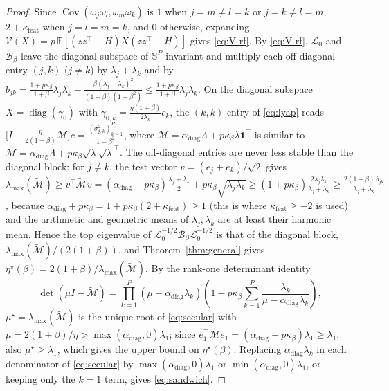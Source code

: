 \documentclass[11pt]{article}
\theoremstyle{remark}
\newcommand{\E}{\mathbb{E}}
\newcommand{\Cov}{\operatorname{Cov}}
\begin{document}
\begin{proof}
Since $\Cov(\omega_j\omega_l, \omega_m\omega_k)$ is $1$ when $j=m\ne l=k$ or $j=k\ne l=m$, $2+\kappa_{\mathrm{feat}}$ when $j=l=m=k$, and $0$ otherwise, expanding $\mathcal V(X) = p\,\E[(zz^\top - H)X(zz^\top - H)]$ gives \eqref{eq:V-rf}. By \eqref{eq:V-rf}, $\mathcal L_0$ and $\mathcal B_\beta$ leave the diagonal subspace of $\mathbb S^P$ invariant and multiply each off-diagonal entry $(j,k)$ ($j \ne k$) by $\lambda_j+\lambda_k$ and by $b_{jk}=\frac{1+p\kappa_\beta}{1+\beta}\lambda_j\lambda_k-\frac{\beta(\lambda_j-\lambda_k)^2}{(1-\beta)(1-\beta^2)}\le\frac{1+p\kappa_\beta}{1+\beta}\lambda_j\lambda_k$. On the diagonal subspace $X = \operatorname{diag}(\gamma_0)$ with $\gamma_{0,k} = \frac{\eta(1+\beta)}{2\lambda_k}c_k$, the $(k,k)$ entry of \eqref{eq:lyap} reads $\big[I - \frac{\eta}{2(1+\beta)}\mathcal M\big]c = \frac{(\sigma_{\xi,k}^2)_{k=1}^P}{1-\beta^2}$, where $\mathcal M = \alpha_{\mathrm{diag}}\Lambda + p\kappa_\beta\lambda\mathbf 1^\top$ is similar to $\widetilde{\mathcal M} = \alpha_{\mathrm{diag}}\Lambda + p\kappa_\beta\sqrt\lambda\sqrt\lambda^\top$. The off-diagonal entries are never less stable than the diagonal block: for $j\ne k$, the test vector $v=(e_j+e_k)/\sqrt2$ gives $\lambda_{\max}(\widetilde{\mathcal M})\ge v^\top\widetilde{\mathcal M}v=(\alpha_{\mathrm{diag}}+p\kappa_\beta)\frac{\lambda_j+\lambda_k}{2}+p\kappa_\beta\sqrt{\lambda_j\lambda_k}\ge(1+p\kappa_\beta)\frac{2\lambda_j\lambda_k}{\lambda_j+\lambda_k}\ge\frac{2(1+\beta)\,b_{jk}}{\lambda_j+\lambda_k}$, because $\alpha_{\mathrm{diag}}+p\kappa_\beta=1+p\kappa_\beta(2+\kappa_{\mathrm{feat}})\ge1$ (this is where $\kappa_{\mathrm{feat}}\ge-2$ is used) and the arithmetic and geometric means of $\lambda_j,\lambda_k$ are at least their harmonic mean. Hence the top eigenvalue of $\mathcal L_0^{-1/2}\mathcal B_\beta\mathcal L_0^{-1/2}$ is that of the diagonal block, $\lambda_{\max}(\widetilde{\mathcal M})/(2(1+\beta))$, and Theorem~\ref{thm:general} gives $\eta^\star(\beta)=2(1+\beta)/\lambda_{\max}(\widetilde{\mathcal M})$. By the rank-one determinant identity
\[
\det(\mu I - \widetilde{\mathcal M}) = \prod_{k=1}^P (\mu - \alpha_{\mathrm{diag}}\lambda_k)\left(1 - p\kappa_\beta\sum_{k=1}^P \frac{\lambda_k}{\mu - \alpha_{\mathrm{diag}}\lambda_k}\right),
\]
$\mu^\star = \lambda_{\max}(\widetilde{\mathcal M})$ is the unique root of \eqref{eq:secular} with $\mu = 2(1+\beta)/\eta > \max(\alpha_{\mathrm{diag}},0)\lambda_1$; since $e_1^\top\widetilde{\mathcal M}e_1 = (\alpha_{\mathrm{diag}}+p\kappa_\beta)\lambda_1 \ge \lambda_1$, also $\mu^\star \ge \lambda_1$, which gives the upper bound on $\eta^\star(\beta)$. Replacing $\alpha_{\mathrm{diag}}\lambda_k$ in each denominator of \eqref{eq:secular} by $\max(\alpha_{\mathrm{diag}},0)\lambda_1$ or $\min(\alpha_{\mathrm{diag}},0)\lambda_1$, or keeping only the $k=1$ term, gives \eqref{eq:sandwich}.
\end{proof}
\end{document}

